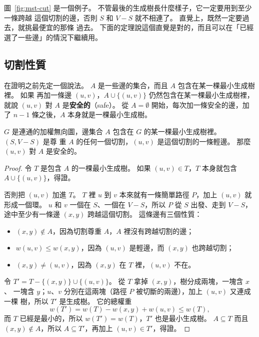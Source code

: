 圖~\ref{fig:mst-cut} 是一個例子。 不管最後的生成樹長什麼樣子，它一定要用到至少一條跨越
這個切割的邊，否則 $S$ 和 $V - S$ 就不相連了。 直覺上，既然一定要過去，就挑最便宜的那條
過去。 下面的定理說這個直覺是對的，而且可以在「已經選了一些邊」的情況下繼續用。

\subsection{切割性質}

在證明之前先定一個說法。 $A$ 是一些邊的集合，而且 $A$ 包含在某一棵最小生成樹裡。 如果
再加一條邊 $(u, v)$，$A \cup \{(u, v)\}$ 仍然包含在某一棵最小生成樹裡，就說 $(u, v)$
對 $A$ 是\textbf{安全的}（safe）。 從 $A = \emptyset$ 開始，每次加一條安全的邊，加了 $n
- 1$ 條之後，$A$ 本身就是一棵最小生成樹。

\begin{theorem}[切割性質]
\label{thm:mst-cut}
$G$ 是連通的加權無向圖，邊集合 $A$ 包含在 $G$ 的某一棵最小生成樹裡。 $(S, V - S)$ 是尊
重 $A$ 的任何一個切割，$(u, v)$ 是這個切割的一條輕邊。 那麼 $(u, v)$ 對 $A$ 是安全的。
\end{theorem}

\begin{proof}
令 $T$ 是包含 $A$ 的一棵最小生成樹。 如果 $(u, v) \in T$，$T$ 本身就包含 $A \cup \{(u,
v)\}$，得證。

否則把 $(u, v)$ 加進 $T$。 $T$ 裡 $u$ 到 $v$ 本來就有一條簡單路徑 $P$，加上 $(u, v)$ 就
形成一個環。 $u$ 和 $v$ 一個在 $S$、一個在 $V - S$，所以 $P$ 從 $S$ 出發、走到 $V - S$，
途中至少有一條邊 $(x, y)$ 跨越這個切割。 這條邊有三個性質：
\begin{itemize}
\item $(x, y) \notin A$，因為切割尊重 $A$，$A$ 裡沒有跨越切割的邊；
\item $w(u, v) \le w(x, y)$，因為 $(u, v)$ 是輕邊，而 $(x, y)$ 也跨越切割；
\item $(x, y) \ne (u, v)$，因為 $(x, y)$ 在 $T$ 裡，$(u, v)$ 不在。
\end{itemize}
令 $T' = T - \{(x, y)\} \cup \{(u, v)\}$。 從 $T$ 拿掉 $(x, y)$，樹分成兩塊，一塊含 $x$、
一塊含 $y$；$u$、$v$ 分別在這兩塊（路徑 $P$ 被切斷的兩邊），加上 $(u, v)$ 又連成一棵
樹，所以 $T'$ 是生成樹。 它的總權重
\[
w(T') = w(T) - w(x, y) + w(u, v) \le w(T),
\]
而 $T$ 已經是最小的，所以 $w(T') = w(T)$，$T'$ 也是最小生成樹。 $A \subseteq T$ 而且
$(x, y) \notin A$，所以 $A \subseteq T'$，再加上 $(u, v) \in T'$，得證。
\end{proof}

